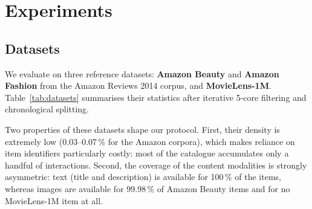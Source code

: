 %
%
%

\section{Experiments}
\label{sec:experiments}

\subsection{Datasets}
\label{sec:datasets}

We evaluate \model{} on three reference datasets: \textbf{Amazon Beauty} and
\textbf{Amazon Fashion} from the Amazon Reviews 2014 corpus, and
\textbf{MovieLens-1M}. Table~\ref{tab:datasets} summarises their statistics
after iterative 5-core filtering and chronological splitting.

Two properties of these datasets shape our protocol. First, their density is
extremely low (0.03--0.07\,\% for the Amazon corpora), which makes reliance on
item identifiers particularly costly: most of the catalogue accumulates only a
handful of interactions. Second, the coverage of the content modalities is
strongly asymmetric: text (title and description) is available for 100\,\% of
the items, whereas images are available for 99.98\,\% of Amazon Beauty items
and for no MovieLens-1M item at all.

